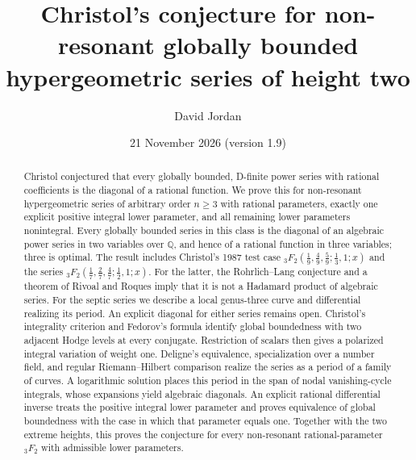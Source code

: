 \documentclass[11pt]{amsart}
\theoremstyle{definition}
\theoremstyle{remark}
\numberwithin{equation}{section}
\newcommand{\Q}{\mathbb{Q}}
\begin{document}
\title[Christol's conjecture in height two]{Christol's conjecture for non-resonant globally bounded hypergeometric series of height two}

\author{David Jordan}
\address{Maynooth University Social Sciences Institute (MUSSI), Maynooth University, Maynooth, County Kildare, Ireland}

\date{21 November 2026 (version 1.9)}

\begin{abstract}
Christol conjectured that every globally bounded, D-finite power series with rational coefficients is the diagonal of a rational function. We prove this for non-resonant hypergeometric series of arbitrary order $n\ge3$ with rational parameters, exactly one explicit positive integral lower parameter, and all remaining lower parameters nonintegral. Every globally bounded series in this class is the diagonal of an algebraic power series in two variables over $\Q$, and hence of a rational function in three variables; three is optimal. The result includes Christol's 1987 test case ${}_3F_2(\frac19,\frac49,\frac59;\frac13,1;x)$ and the series ${}_3F_2(\frac17,\frac27,\frac47;\frac12,1;x)$. For the latter, the Rohrlich--Lang conjecture and a theorem of Rivoal and Roques imply that it is not a Hadamard product of algebraic series. For the septic series we describe a local genus-three curve and differential realizing its period. An explicit diagonal for either series remains open. Christol's integrality criterion and Fedorov's formula identify global boundedness with two adjacent Hodge levels at every conjugate. Restriction of scalars then gives a polarized integral variation of weight one. Deligne's equivalence, specialization over a number field, and regular Riemann--Hilbert comparison realize the series as a period of a family of curves. A logarithmic solution places this period in the span of nodal vanishing-cycle integrals, whose expansions yield algebraic diagonals. An explicit rational differential inverse treats the positive integral lower parameter and proves equivalence of global boundedness with the case in which that parameter equals one. Together with the two extreme heights, this proves the conjecture for every non-resonant rational-parameter \({}_3F_2\) with admissible lower parameters.


\end{abstract}
\end{document}
